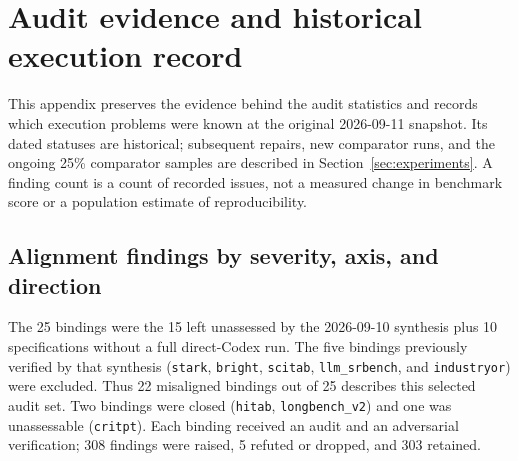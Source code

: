 \section{Audit evidence and historical execution record}
\label{app:audit-details}

This appendix preserves the evidence behind the audit statistics and records which execution
problems were known at the original 2026-09-11 snapshot. Its dated statuses are historical;
subsequent repairs, new comparator runs, and the ongoing 25\% comparator samples are described
in Section~\ref{sec:experiments}. A finding count is a count of recorded issues, not a measured
change in benchmark score or a population estimate of reproducibility.

\subsection{Alignment findings by severity, axis, and direction}
\label{app:audit-breakdown}

The 25 bindings were the 15 left unassessed by the 2026-09-10 synthesis plus 10 specifications
without a full direct-Codex run. The five bindings previously verified by that synthesis
(\texttt{stark}, \texttt{bright}, \texttt{scitab}, \texttt{llm\_srbench}, and
\texttt{industryor}) were excluded. Thus 22 misaligned bindings out of 25 describes this
selected audit set. Two bindings were closed (\texttt{hitab}, \texttt{longbench\_v2}) and one
was unassessable (\texttt{critpt}). Each binding received an audit and an adversarial verification;
308 findings were raised, 5 refuted or dropped, and 303 retained.

